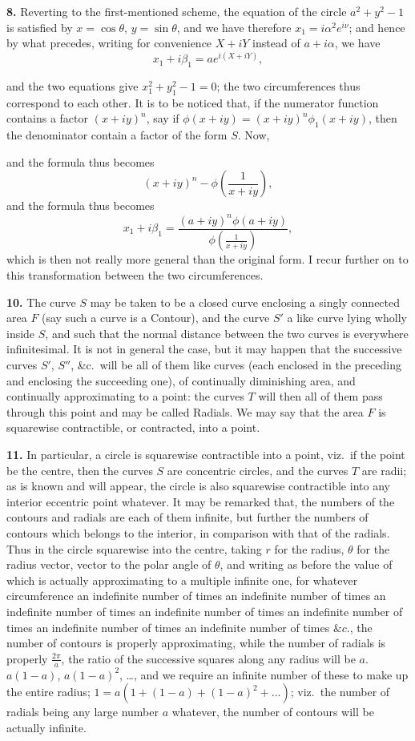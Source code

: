 \documentclass[11pt,a4paper]{article}
\begin{document}
\textbf{8.} Reverting to the first-mentioned scheme, the equation of the circle $a^2 + y^2 - 1$ is satisfied by $x = \cos \theta$, $y = \sin \theta$, and we have therefore $x_1 = i \alpha^2 e^{i \nu}$; and hence by what precedes, writing for convenience $X + i Y$ instead of $a + i \alpha$, we have
\[
x_1 + i\beta_1 = a e^{i (X + i Y)},
\]

and the two equations give $x_1^2 + y_1^2 - 1 = 0$; the two circumferences thus correspond to each other. It is to be noticed that, if the numerator function contains a factor $(x + iy)^n$, say if $\phi(x + iy) = (x + i y)^n \phi_1(x + iy)$, then the denominator contain a factor of the form $S$. Now,

and the formula thus becomes
\[
(x + i y)^n - \phi\left(\frac{1}{x + iy}\right),
\]
and the formula thus becomes
\[
x_1 + i\beta_1 = \frac{(a + i y)^n \phi(a + i y)}{\phi\left(\frac{1}{x + iy}\right)},
\]
which is then not really more general than the original form. I recur further on to this transformation between the two circumferences.

\textbf{10.} The curve $S$ may be taken to be a closed curve enclosing a singly connected area $F$ (say such a curve is a Contour), and the curve $S'$ a like curve lying wholly inside $S$, and such that the normal distance between the two curves is everywhere infinitesimal. It is not in general the case, but it may happen that the successive curves $S'$, $S''$, \&c.\ will be all of them like curves (each enclosed in the preceding and enclosing the succeeding one), of continually diminishing area, and continually approximating to a point: the curves $T$ will then all of them pass through this point and may be called Radials. We may say that the area $F$ is squarewise contractible, or contracted, into a point.

\textbf{11.} In particular, a circle is squarewise contractible into a point, viz.\ if the point be the centre, then the curves $S$ are concentric circles, and the curves $T$ are radii; as is known and will appear, the circle is also squarewise contractible into any interior eccentric point whatever. It may be remarked that, the numbers of the contours and radials are each of them infinite, but further the numbers of contours which belongs to the interior, in comparison with that of the radials. Thus in the circle squarewise into the centre, taking $r$ for the radius, $\theta$ for the radius vector, vector to the polar angle of $\theta$, and writing as before the value of which is actually approximating to a multiple infinite one, for whatever circumference an indefinite number of times an indefinite number of times an indefinite number of times an indefinite number of times an indefinite number of times an indefinite number of times an indefinite number of times $\&c.$, the number of contours is properly approximating, while the number of radials is properly $\frac{2\pi}{a}$, the ratio of the successive squares along any radius will be $a$. $a(1 - a)$, $a(1 - a)^2$, \ldots, and we require an infinite number of these to make up the entire radius; $1 = a (1 + (1 - a) + (1 - a)^2 + \ldots)$; viz.\ the number of radials being any large number $a$ whatever, the number of contours will be actually infinite.
\end{document}
